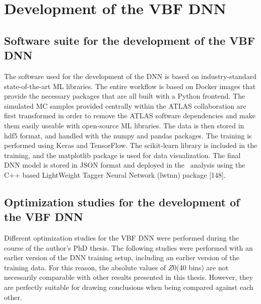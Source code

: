 \chapter{Development of the VBF DNN}


\section{Software suite for the development of the VBF DNN}
\label{app:dnn:software-suite}
The software used for the development of the DNN is based on industry-standard state-of-the-art ML libraries. 
The entire workflow is based on Docker images that provide the necessary packages that are all built with a Python frontend. The simulated MC samples provided centrally within the ATLAS collaboration are first transformed in order to remove the ATLAS software dependencies and make them easily useable with open-source ML libraries. The data is then stored in hdf5 format, and handled with the numpy and pandas packages. The training is performed using Keras and TensorFlow. The scikit-learn library is included in the training, and the matplotlib package is used for data visualization. The final DNN model is stored in JSON format and deployed in the \HWW\ analysis using the C++ based LightWeight Tagger Neural Network (lwtnn) package [148].


\section{Optimization studies for the development of the VBF DNN}
\label{app:dnn:opt-studies}

Different optimization studies for the VBF DNN were performed during the course of the author's PhD thesis.
The following studies were performed with an earlier version of the DNN training setup, including an earlier version of the training data. For this reason, the absolute values of $Z0$(40 bins) are not necessarily comparable with other results presented in this thesis. However, they are perfectly suitable for drawing conclusions when being compared against each other.

